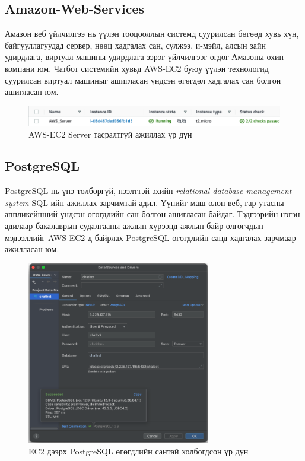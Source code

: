 \subsection{Amazon-Web-Services}
Амазон веб үйлчилгээ нь үүлэн тооцооллын системд суурилсан бөгөөд хувь хүн, байгууллагуудад сервер, нөөц хадгалах сан, сүлжээ, и-мэйл, алсын зайн удирдлага, виртуал машины удирдлага зэрэг үйлчилгээг өгдөг Амазоны охин компани юм. Чатбот системийн хувьд AWS-EC2 буюу үүлэн технологид суурилсан виртуал машиныг ашигласан үндсэн өгөгдөл хадгалах сан болгон ашигласан юм. 
\begin{figure}[ht]
  \centering
  \includegraphics[width=\textwidth]{images/aws-ec2.png}
  \caption{AWS-EC2 Server тасралтгүй ажиллах үр дүн} \label{fig:aws-ec2}
\end{figure}
\subsection{PostgreSQL}
PostgreSQL нь үнэ төлбөргүй, нээлттэй эхийн \textit{relational database management system} SQL-ийн ажиллах зарчимтай адил. Үүнийг маш олон веб, гар утасны аппликейшний үндсэн өгөгдлийн сан болгон ашигласан байдаг. Тэдгээрийн нэгэн адилаар бакалаврын судалгааны ажлын хүрээнд ажлын байр олгогчдын мэдээллийг AWS-EC2-д байрлах PostgreSQL өгөгдлийн санд хадгалах зарчмаар ажилласан юм. 
\begin{figure}[ht]
  \centering
  \includegraphics[height=8cm]{images/postgresConnection.png}
  \caption{EC2 дээрх PostgreSQL өгөгдлийн сантай холбогдсон үр дүн}\label{fig:postgresConnection}
\end{figure}
